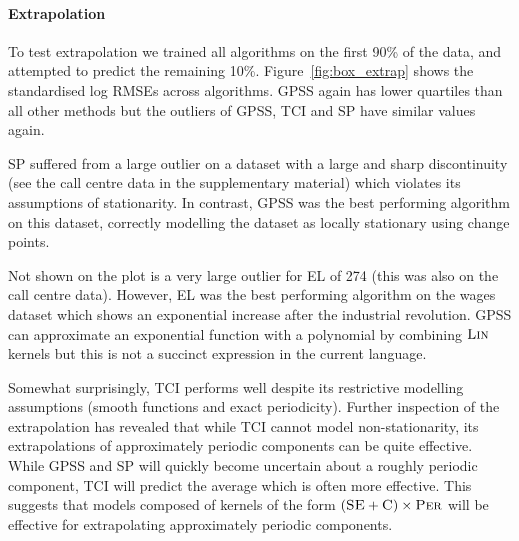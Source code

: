 \documentclass{article}
\begin{document}
\paragraph{Extrapolation}

To test extrapolation we trained all algorithms on the first 90\% of the data, and attempted to predict the remaining 10\%.
Figure~\ref{fig:box_extrap} shows the standardised log RMSEs across algorithms.
GPSS again has lower quartiles than all other methods but the outliers of GPSS, TCI and SP have similar values again.



SP suffered from a large outlier on a dataset with a large and sharp discontinuity (see the call centre data in the supplementary material) which violates its assumptions of stationarity.
In contrast, GPSS was the best performing algorithm on this dataset, correctly modelling the dataset as locally stationary using change points.

Not shown on the plot is a very large outlier for EL of 274 (this was also on the call centre data).
However, EL was the best performing algorithm on the wages dataset which shows an exponential increase after the industrial revolution.
GPSS can approximate an exponential function with a polynomial by combining ${\textsc{Lin}}$ kernels but this is not a succinct expression in the current language.

Somewhat surprisingly, TCI performs well despite its restrictive modelling assumptions (smooth functions and exact periodicity).
Further inspection of the extrapolation has revealed that while TCI cannot model non-stationarity, its extrapolations of approximately periodic components can be quite effective.
While GPSS and SP will quickly become uncertain about a roughly periodic component, TCI will predict the average which is often more effective.
This suggests that models composed of kernels of the form $({\textsc{SE}} + {\textsc{C}}) \times {\textsc{Per}}$ will be effective for extrapolating approximately periodic components.
\end{document}
